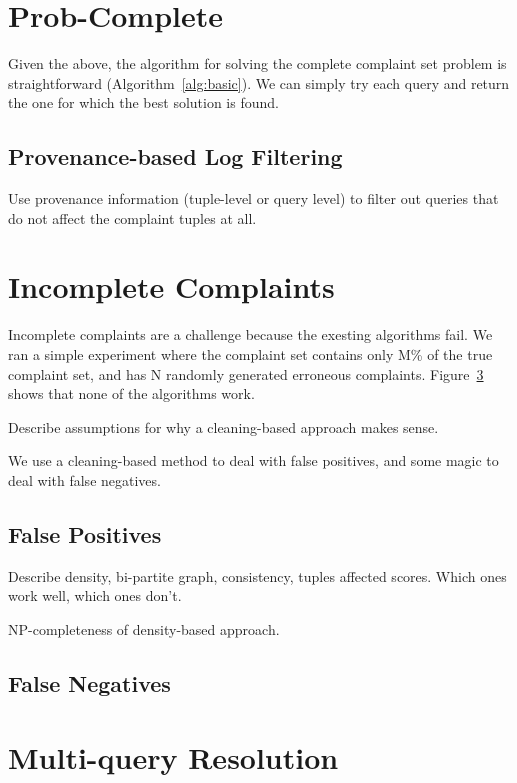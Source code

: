 \section{Prob-Complete}

Given the above, the algorithm for solving the complete complaint set problem is straightforward (Algorithm~\ref{alg:basic}).
We can simply try each query and return the one for which the best solution is found.

\subsection{Provenance-based Log Filtering}

Use provenance information (tuple-level or query level) to filter out queries that do not 
affect the complaint tuples at all.





\section{Incomplete Complaints}
\label{s:incomplete-algs}

Incomplete complaints are a challenge because the exesting algorithms fail.  We ran a simple experiment
where the complaint set contains only M\% of the true complaint set, and has N randomly generated erroneous complaints.
Figure~\ref{} shows that none of the algorithms work.

Describe assumptions for why a cleaning-based approach makes sense.

We use a cleaning-based method to deal with false positives, and some magic to deal with false negatives.

\subsection{False Positives}

Describe density, bi-partite graph, consistency, tuples affected scores.  Which ones work well, which ones don't.

NP-completeness of density-based approach.


\subsection{False Negatives}



\section{Multi-query Resolution}

